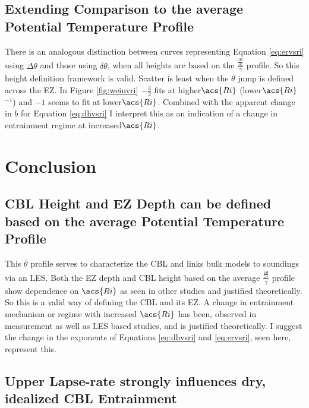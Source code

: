\subsection{Extending Comparison to the average Potential Temperature Profile}

There is an analogous distinction between curves representing Equation \ref{eq:ervsri} using $\Delta \theta$ and those using $\delta \theta$, when all heights are based on the $\frac{\frac{\partial \overline{\theta}}{\partial z}}{\gamma}$ profile.  So this height definition framework is valid.  Scatter is least when the $\theta$ jump is defined across the \acs{EZ}.  In Figure \ref{fig:weinvri} $-\frac{3}{2}$ fits at higher$\acs{Ri}$ (lower$\acs{Ri}$$^{-1}$) and $-1$ seems to fit at lower$\acs{Ri}$.  Combined with the apparent change in $b$ for Equation \ref{eq:dhvsri} I interpret this as an indication of a change in entrainment regime at increased$\acs{Ri}$.\\ 

\section{Conclusion}

\subsection{\acs{CBL} Height and \acs{EZ} Depth can be defined based on the average Potential Temperature Profile}

This $\overline{\theta}$ profile serves to characterize the \acs{CBL} and links bulk models to soundings via an \acs{LES}.  Both the \acs{EZ} depth and \acs{CBL} height based on the average $\frac{\frac{\partial \overline{\theta}}{\partial z}}{\gamma}$ profile show dependence on $\acs{Ri}$ as seen in other studies and justified theoretically.  So this is a valid way of defining the \acs{CBL} and its \acs{EZ}.  A change in entrainment mechanism or regime with increased $\acs{Ri}$ has been, observed in measurement as well as \acs{LES} based studies, and is justified theoretically. I suggest the change in the exponents of Equations \ref{eq:dhvsri} and \ref{eq:ervsri}, seen here, represent this.\\

\subsection{Upper Lapse-rate strongly influences dry, idealized \acs{CBL} Entrainment}

